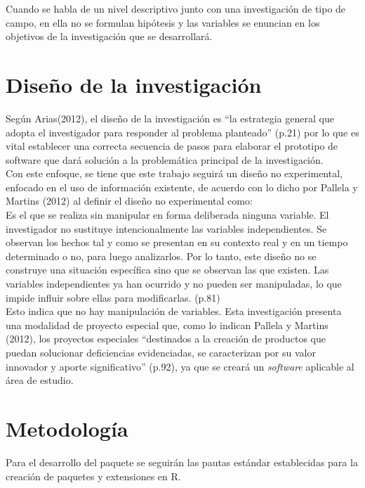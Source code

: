 	Cuando se habla de un nivel descriptivo junto con una investigaci\'on de tipo de campo, en ella no se formulan hip\'otesis y las variables se enuncian en los objetivos de la investigaci\'on que se desarrollar\'a.
	
\section{Dise\~no de la investigaci\'on}
	
Seg\'un Arias(2012), el dise\~no de la investigaci\'on es “la estrategia general que adopta el investigador para responder al problema planteado” (p.21) por lo que es vital establecer una correcta secuencia de pasos para elaborar el prototipo de software que dar\'a soluci\'on a la problem\'atica principal de la investigaci\'on.\\

Con este enfoque, se tiene que este trabajo seguir\'a un dise\~no no experimental, enfocado en el uso de informaci\'on existente, de acuerdo con lo dicho por Pallela y  Martins (2012) al definir el dise\~no no experimental como:\\

Es el que se realiza sin manipular en forma deliberada ninguna variable. El investigador no sustituye intencionalmente las variables independientes. Se observan los hechos tal y como se presentan en su contexto real y en un tiempo determinado o no, para luego analizarlos. Por lo tanto, este dise\~no no se construye una situaci\'on espec\'ifica sino que se observan las que existen. Las variables independientes ya han ocurrido y no pueden ser manipuladas, lo que impide influir sobre ellas para modificarlas. (p.81)\\

Esto indica que no hay manipulaci\'on de variables. Esta investigaci\'on presenta una modalidad de proyecto especial que, como lo indican Pallela y  Martins (2012), los proyectos especiales “destinados a la creaci\'on de productos que puedan solucionar deficiencias evidenciadas, se caracterizan por su valor innovador y aporte significativo” (p.92), ya que se crear\'a un \emph{software} aplicable al \'area de estudio.\\

\section{Metodolog\'ia}

Para el desarrollo del paquete  se seguir\'an las pautas est\'andar establecidas para la creación de paquetes y extensiones en R.\\

